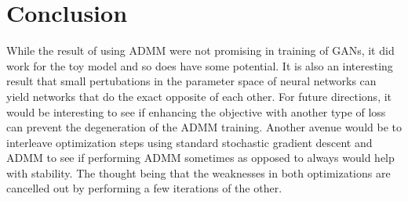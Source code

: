 \documentclass{article}
\begin{document}
  \section{Conclusion}

  While the result of using ADMM were not promising in training of GANs, it did work for the toy model and so does have some potential. It is also an interesting result that small pertubations in the parameter space of neural networks can yield networks that do the exact opposite of each other. For future directions, it would be interesting to see if enhancing the objective with another type of loss can prevent the degeneration of the ADMM training. Another avenue would be to interleave optimization steps using standard stochastic gradient descent and ADMM to see if performing ADMM sometimes as opposed to always would help with stability. The thought being that the weaknesses in both optimizations are cancelled out by performing a few iterations of the other.

  \clearpage

  
  
\end{document}
